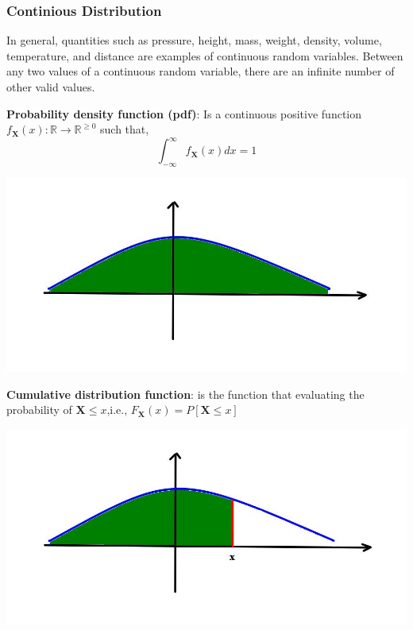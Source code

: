 \documentclass[12pt,aspectratio=169]{beamer}
\renewcommand{\Re}{\mathbb{R}}
\begin{document}
\begin{frame}
\frametitle{Continious Distribution}
In general, quantities such as pressure, height, mass, weight, density, volume, temperature, and distance are examples of continuous random variables. \pause Between any two values of a continuous random variable, there are an infinite number of other valid values.
\end{frame}

\begin{frame}
\textbf{Probability density function (pdf)}: Is a continuous positive function $f_{\mathbf{X}}(x):\Re\to \Re^{\geq 0}$ such that,\pause
\[
\int_{-\infty}^{\infty}f_{\mathbf{X}}(x)dx=1
\]\pause
\begin{center}
\includegraphics[scale=0.4]{normal}
\end{center}
\end{frame}


\begin{frame}
\textbf{Cumulative distribution function}: is the function that evaluating the probability of $\mathbf{X}\leq x$,\pause i.e., $F_{\mathbf{X}}(x)=P[\mathbf{X}\leq x]$ \pause
\begin{center}
\includegraphics[scale=0.4]{normal2}
\end{center}
\end{frame}
\end{document}
